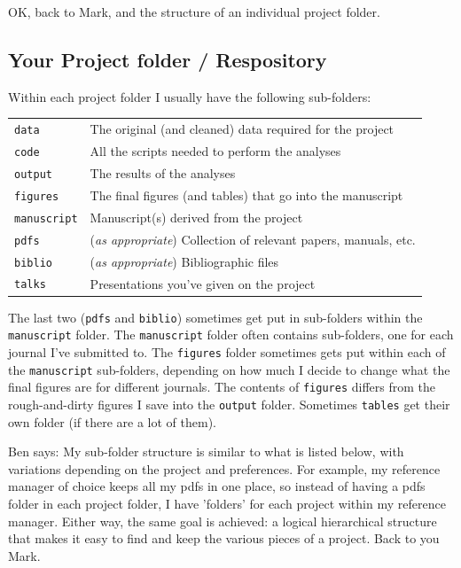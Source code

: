\documentclass[12pt,letterpaper]{article}
\begin{document}
OK, back to Mark, and the structure of an individual project folder.

\subsection{Your Project folder / Respository} \label{projectfolder}
Within each project folder I  usually have the following sub-folders:

\begin{tabular}{ll}
 \texttt{data} & The original (and cleaned) data required for the project\\
 \texttt{code} & All the scripts needed to perform the analyses \\
 \texttt{output} & The results of the analyses \\
 \texttt{figures} & The final figures (and tables) that go into the manuscript\\
 \texttt{manuscript} & Manuscript(s) derived from the project\\
 \texttt{pdfs} & (\emph{as appropriate}) Collection of relevant papers, manuals, etc.\\
 \texttt{biblio} & (\emph{as appropriate}) Bibliographic files\\
 \texttt{talks} & Presentations you've given on the project\\
\end{tabular}

The last two (\texttt{pdfs} and \texttt{biblio}) sometimes get put in sub-folders within the \texttt{manuscript} folder.  The  \texttt{manuscript} folder often contains sub-folders, one for each journal I've submitted to.  The \texttt{figures} folder sometimes gets put within each of the  \texttt{manuscript} sub-folders, depending on how much I decide to change what the final figures are for different journals.  The contents of \texttt{figures} differs from the rough-and-dirty figures I save into the \texttt{output} folder.  Sometimes \texttt{tables} get their own folder (if there are a lot of them). 

Ben says: My sub-folder structure is similar to what is listed below, with variations depending on the project and preferences. For example, my reference manager of choice keeps all my pdfs in one place, so instead of having a pdfs folder in each project folder, I have 'folders' for each project within my reference manager. Either way, the same goal is achieved: a logical hierarchical structure that makes it easy to find and keep the various pieces of a project. Back to you Mark.
\end{document}
